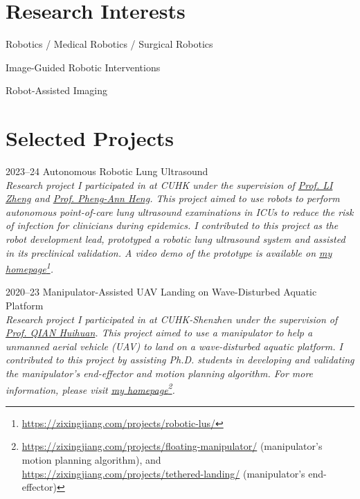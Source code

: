 \documentclass[11pt,letterpaper]{report}
\newcommand{\listitemspace}{0.25em}
\renewenvironment{itemize}
{\begin{list}{}{\setlength{\leftmargin}{0em}
			\setlength{\parskip}{0em}
			\setlength{\itemsep}{\listitemspace}
			\setlength{\parsep}{\listitemspace}}}
	{\end{list}}
\begin{document}
\section*{Research Interests}
\begin{itemize}
	\item Robotics / Medical Robotics / Surgical Robotics
	\item Image-Guided Robotic Interventions
	\item Robot-Assisted Imaging
\end{itemize}
	
\section*{Selected Projects}
\begin{tablist}
	\item[2023--24] \tab Autonomous Robotic Lung Ultrasound\\\vspace{\listitemspace}
	\emph{Research project I participated in at CUHK under the supervision of \href{https://www.surgery.cuhk.edu.hk/profile.asp?alias=zli}{Prof. LI Zheng} and \href{https://www.cse.cuhk.edu.hk/people/faculty/pheng-ann-heng/}{Prof. Pheng-Ann Heng}. This project aimed to use robots to perform autonomous point-of-care lung ultrasound examinations in ICUs to reduce the risk of infection for clinicians during epidemics. I contributed to this project as the robot development lead, prototyped a robotic lung ultrasound system and assisted in its preclinical validation. A video demo of the prototype is available on \href{https://www.zixingjiang.com/projects/robotic-lus/}{my homepage}\footnote{ \href{https://zixingjiang.com/projects/robotic-lus/}{https://zixingjiang.com/projects/robotic-lus/}}.}
	
	\item[2020--23] \tab Manipulator-Assisted UAV Landing on Wave-Disturbed Aquatic Platform\\\vspace{\listitemspace}
	 \textit{Research project I participated in at CUHK-Shenzhen under the supervision of \href{https://sse.cuhk.edu.cn/en/faculty/qianhuihuan}{Prof. QIAN Huihuan}. This project aimed to use a manipulator to help a unmanned aerial vehicle (UAV) to land on a wave-disturbed aquatic platform. I contributed to this project by assisting Ph.D. students in developing and validating the manipulator's end-effector and motion planning algorithm. For more information, please visit  \href{https://zixingjiang.com/projects/\#marine-robotics}{my homepage}\footnote{ \href{https://zixingjiang.com/projects/floating-manipulator/}{https://zixingjiang.com/projects/floating-manipulator/} (manipulator's motion planning algorithm), and \\ \href{https://zixingjiang.com/projects/tethered-landing/}{https://zixingjiang.com/projects/tethered-landing/}  (manipulator's end-effector)}.}
\end{tablist}
	
\end{document}
